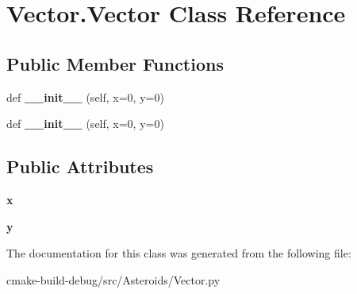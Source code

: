 \hypertarget{classVector_1_1Vector}{}\section{Vector.\+Vector Class Reference}
\label{classVector_1_1Vector}
\subsection*{Public Member Functions}
\begin{DoxyCompactItemize}
\item 
def {\bfseries \+\_\+\+\_\+init\+\_\+\+\_\+} (self, x=0, y=0)\hypertarget{classVector_1_1Vector_a53f3e407d6040c60bbb2faa503243218}{}\label{classVector_1_1Vector_a53f3e407d6040c60bbb2faa503243218}

\item 
def {\bfseries \+\_\+\+\_\+init\+\_\+\+\_\+} (self, x=0, y=0)\hypertarget{classVector_1_1Vector_a53f3e407d6040c60bbb2faa503243218}{}\label{classVector_1_1Vector_a53f3e407d6040c60bbb2faa503243218}

\end{DoxyCompactItemize}
\subsection*{Public Attributes}
\begin{DoxyCompactItemize}
\item 
{\bfseries x}\hypertarget{classVector_1_1Vector_a7f3c3f2b1e0b9e3b97a4f9991a76e0b2}{}\label{classVector_1_1Vector_a7f3c3f2b1e0b9e3b97a4f9991a76e0b2}

\item 
{\bfseries y}\hypertarget{classVector_1_1Vector_a61e9316c753c3d76705841e0d009e4b6}{}\label{classVector_1_1Vector_a61e9316c753c3d76705841e0d009e4b6}

\end{DoxyCompactItemize}


The documentation for this class was generated from the following file\+:\begin{DoxyCompactItemize}
\item 
cmake-\/build-\/debug/src/\+Asteroids/Vector.\+py\end{DoxyCompactItemize}
